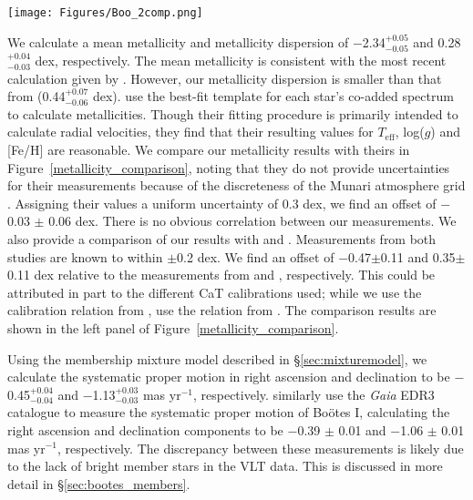 \documentclass[twocolumn]{aastex63}
\newcommand{\revise}[1]{#1}
\begin{document}
\begin{figure*}
\centering
\texttt{[image: Figures/Boo\_2comp.png]}
\caption{ \revise{Two-dimensional posterior probability distribution from a MCMC sampler using a seven-parameter likelihood. We use the following parameters: the mean velocity of Bo{\"o}tes I $\mu$, the mean velocity of the foreground MW stars $\mu_{MW}$, the velocity dispersion of the first Bo{\"o}tes I velocity component $\sigma_1$, the velocity dispersion of the second Bo{\"o}tes I velocity component $\sigma_2$, the velocity dispersion of the MW stars $\sigma_{MW}$, the fraction of Bo{\"o}tes I stars in the first velocity component $f$, and the fraction of MW stars $f_{MW}$.} \label{2comp}
}
\end{figure*}

We calculate a mean metallicity and metallicity dispersion of \revise{$-$2.34$^{+0.05}_{-0.05}$ and 0.28$^{+0.04}_{-0.03}$ dex}, respectively. The mean metallicity is consistent with the most recent calculation given by \citet{sim2019}. However, our metallicity dispersion is smaller than that from \citet{sim2019} (0.44$^{+0.07}_{-0.06}$ dex). \citet{kop2011} use the best-fit template for each star's co-added spectrum to calculate metallicities. Though their fitting procedure is primarily intended to calculate radial velocities, they find that their resulting values for $T_\mathrm{eff}$, log($g$) and [Fe/H] are reasonable. We compare our metallicity results with theirs in Figure~\ref{metallicity_comparison}, noting that they do not provide uncertainties for their measurements because of the discreteness of the Munari atmosphere grid \citep{mun2005}. Assigning their values a uniform uncertainty of 0.3 dex, we find an offset of $-$0.03 $\pm$ 0.06 dex. There is no obvious correlation between our measurements. We also provide a comparison of our results with \citet{Mar2007} and \cite{lai2011}. Measurements from both studies are known to within $\pm$0.2 dex. We find an offset of $-$0.47$\pm$0.11 and 0.35$\pm$0.11 dex relative to the measurements from \citet{Mar2007} and \citet{lai2011}, respectively. This could be attributed in part to the different CaT calibrations used; while we use the calibration relation from \citet{car2013}, \citet{Mar2007} use the relation from \citet{rut1997}. The comparison results are shown in the left panel of Figure~\ref{metallicity_comparison}.

Using the membership mixture model described in \S\ref{sec:mixturemodel}, we calculate the systematic proper motion in right ascension and declination to be $-$0.45$^{+0.04}_{-0.04}$ and $-$1.13$^{+0.03}_{-0.03}$ mas yr$^{-1}$, respectively. \citet{mcc2020} similarly use the {\it Gaia} EDR3 catalogue to measure the systematic proper motion of Bo{\"o}tes I, calculating the right ascension and declination components to be $-$0.39 $\pm$ 0.01 and $-$1.06 $\pm$ 0.01 mas yr$^{-1}$, respectively. The discrepancy between these measurements is likely due to the lack of bright member stars in the VLT data. This is discussed in more detail in \S\ref{sec:bootes_members}.
\end{document}
